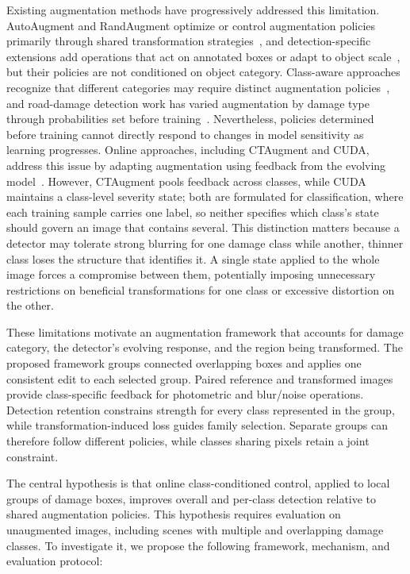 \documentclass[conference]{IEEEtran}
\begin{document}
Existing augmentation methods have progressively addressed this limitation. AutoAugment and RandAugment optimize or control augmentation policies primarily through shared transformation strategies~\cite{cubuk2019auto,cubuk2020rand}, and detection-specific extensions add operations that act on annotated boxes or adapt to object scale~\cite{zoph2020det,chen2021scale}, but their policies are not conditioned on object category. Class-aware approaches recognize that different categories may require distinct augmentation policies~\cite{tsuchiya2019,yoo2023,cheung2022adaaug}, and road-damage detection work has varied augmentation by damage type through probabilities set before training~\cite{rdd_detectron2}. Nevertheless, policies determined before training cannot directly respond to changes in model sensitivity as learning progresses. Online approaches, including CTAugment and CUDA, address this issue by adapting augmentation using feedback from the evolving model~\cite{berthelot2020,ahn2023cuda}. However, CTAugment pools feedback across classes, while CUDA maintains a class-level severity state; both are formulated for classification, where each training sample carries one label, so neither specifies which class's state should govern an image that contains several. This distinction matters because a detector may tolerate strong blurring for one damage class while another, thinner class loses the structure that identifies it. A single state applied to the whole image forces a compromise between them, potentially imposing unnecessary restrictions on beneficial transformations for one class or excessive distortion on the other.

These limitations motivate an augmentation framework that accounts for damage category, the detector's evolving response, and the region being transformed. The proposed framework groups connected overlapping boxes and applies one consistent edit to each selected group. Paired reference and transformed images provide class-specific feedback for photometric and blur/noise operations. Detection retention constrains strength for every class represented in the group, while transformation-induced loss guides family selection. Separate groups can therefore follow different policies, while classes sharing pixels retain a joint constraint.

The central hypothesis is that online class-conditioned control, applied to local groups of damage boxes, improves overall and per-class detection relative to shared augmentation policies. This hypothesis requires evaluation on unaugmented images, including scenes with multiple and overlapping damage classes. To investigate it, we propose the following framework, mechanism, and evaluation protocol:
\end{document}

